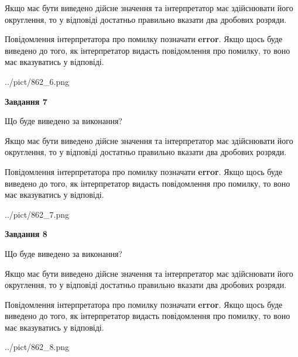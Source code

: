 \documentclass[12pt, ukrainian]{article}
\begin{document}
{\begin {Large}
Якщо має бути виведено дійсне значення та інтерпретатор має здійснювати його округлення, 
то у відповіді достатньо правильно вказати два дробових розряди.

Повідомлення інтерпретатора про помилку позначати \textbf{error}.
Якщо щось буде виведено до того, як інтерпретатор видасть повідомлення про помилку, 
то воно має вказуватись у відповіді. \par

\begin{center}
	{../pict/862_6.png}
\end{center}
\newpage

{\begin {center}\textbf{Завдання 7}\end {center}}\par
Що буде виведено за виконання? \par

Якщо має бути виведено дійсне значення та інтерпретатор має здійснювати його округлення, 
то у відповіді достатньо правильно вказати два дробових розряди.

Повідомлення інтерпретатора про помилку позначати \textbf{error}.
Якщо щось буде виведено до того, як інтерпретатор видасть повідомлення про помилку, 
то воно має вказуватись у відповіді. \par

\begin{center}
	{../pict/862_7.png}
\end{center}
\newpage

{\begin {center}\textbf{Завдання 8}\end {center}}\par
Що буде виведено за виконання? \par

Якщо має бути виведено дійсне значення та інтерпретатор має здійснювати його округлення, 
то у відповіді достатньо правильно вказати два дробових розряди.

Повідомлення інтерпретатора про помилку позначати \textbf{error}.
Якщо щось буде виведено до того, як інтерпретатор видасть повідомлення про помилку, 
то воно має вказуватись у відповіді. \par

\begin{center}
	{../pict/862_8.png}
\end{center}
\newpage


\end{Large}}
\end{document}
